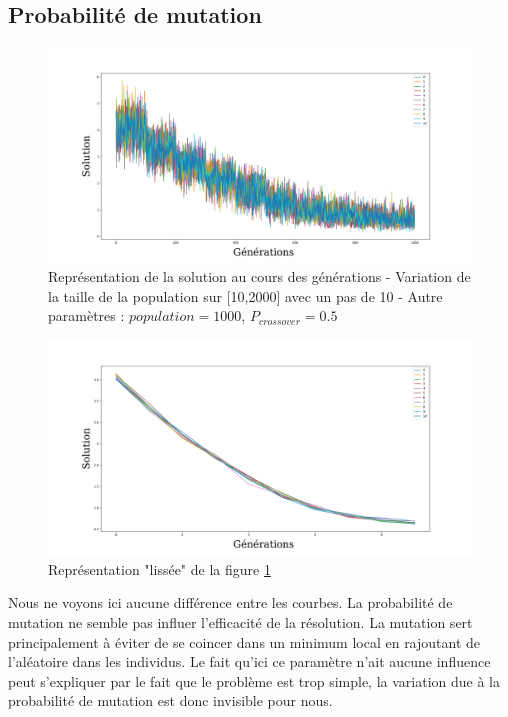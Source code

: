 \documentclass[12pt]{report}
\begin{document}
      \subsection{Probabilité de mutation}

      \begin{figure}[h]
        \centering
        \includegraphics[width=17cm]{img/evo_mutation_brut.png}
        \caption{Représentation de la solution au cours des générations - Variation de la taille de la population sur [10,2000] avec un pas de 10 - Autre paramètres : $population = 1000$, $P_{crossover} = 0.5$}
        \label{evo_mutation_brut}
      \end{figure}

      \begin{figure}[!]
        \centering
        \includegraphics[width=17cm]{img/evo_mutation_moy.png}
        \caption{Représentation "lissée" de la figure \ref{evo_mutation_brut}}
        \label{evo_mutation_moy}
      \end{figure}

      Nous ne voyons ici aucune différence entre les courbes. La probabilité de mutation ne semble pas influer l'efficacité de la résolution. La mutation sert principalement à éviter de se coincer dans un minimum local en rajoutant de l'aléatoire dans les individus. Le fait qu'ici ce paramètre n'ait aucune influence peut s'expliquer par le fait que le problème est trop simple, la variation due à la probabilité de mutation est donc invisible pour nous.
\end{document}
